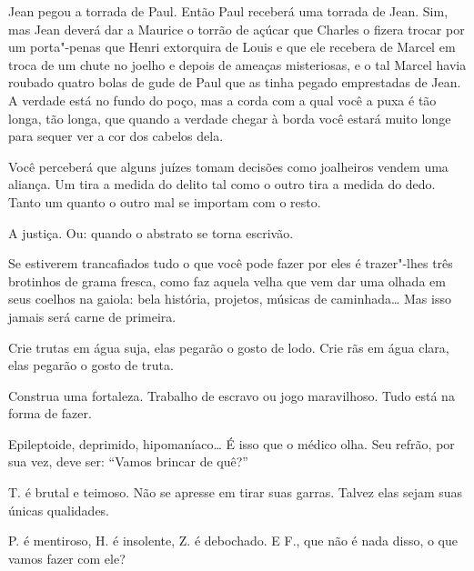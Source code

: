\bigskip
\bigskip

Jean pegou a torrada de Paul. Então Paul receberá uma torrada de Jean.
Sim, mas Jean deverá dar a Maurice o torrão de açúcar que Charles o
fizera trocar por um porta"-penas que Henri extorquira de Louis e que ele
recebera de Marcel em troca de um chute no joelho e depois de ameaças
misteriosas, e o tal Marcel havia roubado quatro bolas de gude de Paul
que as tinha pegado emprestadas de Jean. A verdade está no fundo do
poço, mas a corda com a qual você a puxa é tão longa, tão longa, que
quando a verdade chegar à borda você estará muito longe para sequer ver
a cor dos cabelos dela.

\bigskip
\bigskip

Você perceberá que alguns juízes tomam decisões como joalheiros vendem
uma aliança. Um tira a medida do delito tal como o outro tira a medida
do dedo. Tanto um quanto o outro mal se importam com o resto.

\bigskip
\bigskip

A justiça. Ou: quando o abstrato se torna escrivão.

\bigskip
\bigskip

Se estiverem trancafiados tudo o que você pode fazer por eles é
trazer"-lhes três brotinhos de grama fresca, como faz aquela velha que
vem dar uma olhada em seus coelhos na gaiola: bela história, projetos,
músicas de caminhada\ldots{} Mas isso jamais será carne de primeira.

\bigskip
\bigskip

Crie trutas em água suja, elas pegarão o gosto de lodo. Crie rãs em água
clara, elas pegarão o gosto de truta.

\bigskip
\bigskip

Construa uma fortaleza. Trabalho de escravo ou jogo maravilhoso. Tudo
está na forma de fazer.

\bigskip
\bigskip

Epileptoide, deprimido, hipomaníaco\ldots{} É isso que o médico olha. Seu
refrão, por sua vez, deve ser: ``Vamos brincar de quê?''

\bigskip
\bigskip

T. é brutal e teimoso. Não se apresse em tirar suas garras. Talvez elas
sejam suas únicas qualidades.

\bigskip
\bigskip

P. é mentiroso, H. é insolente, Z. é debochado. E F., que não é nada
disso, o que vamos fazer com ele?

\bigskip
\bigskip

